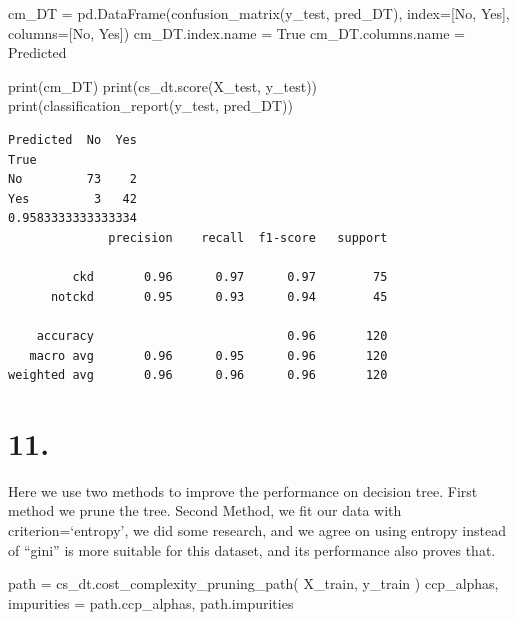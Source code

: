 \documentclass[
  11pt,
  letterpaper,
  DIV=11,
  numbers=noendperiod]{scrartcl}
\newenvironment{Shaded}{\begin{snugshade}}{\end{snugshade}}
\newcommand{\BuiltInTok}[1]{\textcolor[rgb]{0.00,0.23,0.31}{#1}}
\newcommand{\NormalTok}[1]{\textcolor[rgb]{0.00,0.23,0.31}{#1}}
\newcommand{\OperatorTok}[1]{\textcolor[rgb]{0.37,0.37,0.37}{#1}}
\newcommand{\StringTok}[1]{\textcolor[rgb]{0.13,0.47,0.30}{#1}}
\begin{document}
\begin{Shaded}
\begin{Highlighting}[]

\NormalTok{cm\_DT }\OperatorTok{=}\NormalTok{ pd.DataFrame(confusion\_matrix(y\_test, pred\_DT), index}\OperatorTok{=}\NormalTok{[}\StringTok{\textquotesingle{}No\textquotesingle{}}\NormalTok{, }\StringTok{\textquotesingle{}Yes\textquotesingle{}}\NormalTok{], columns}\OperatorTok{=}\NormalTok{[}\StringTok{\textquotesingle{}No\textquotesingle{}}\NormalTok{, }\StringTok{\textquotesingle{}Yes\textquotesingle{}}\NormalTok{])}
\NormalTok{cm\_DT.index.name }\OperatorTok{=} \StringTok{\textquotesingle{}True\textquotesingle{}}
\NormalTok{cm\_DT.columns.name }\OperatorTok{=} \StringTok{\textquotesingle{}Predicted\textquotesingle{}}


\BuiltInTok{print}\NormalTok{(cm\_DT)}
\BuiltInTok{print}\NormalTok{(cs\_dt.score(X\_test, y\_test))}
\BuiltInTok{print}\NormalTok{(classification\_report(y\_test, pred\_DT))}
\end{Highlighting}
\end{Shaded}

\begin{verbatim}
Predicted  No  Yes
True              
No         73    2
Yes         3   42
0.9583333333333334
              precision    recall  f1-score   support

         ckd       0.96      0.97      0.97        75
      notckd       0.95      0.93      0.94        45

    accuracy                           0.96       120
   macro avg       0.96      0.95      0.96       120
weighted avg       0.96      0.96      0.96       120
\end{verbatim}

\section{11.}\label{section-5}

Here we use two methods to improve the performance on decision tree.
First method we prune the tree. Second Method, we fit our data with
criterion=`entropy', we did some research, and we agree on using entropy
instead of ``gini'' is more suitable for this dataset, and its
performance also proves that.

\begin{Shaded}
\begin{Highlighting}[]
\NormalTok{path }\OperatorTok{=}\NormalTok{ cs\_dt.cost\_complexity\_pruning\_path(}
\NormalTok{    X\_train, }
\NormalTok{    y\_train}
\NormalTok{)}
\NormalTok{ccp\_alphas, impurities }\OperatorTok{=}\NormalTok{ path.ccp\_alphas, path.impurities}
\end{Highlighting}
\end{Shaded}
\end{document}
